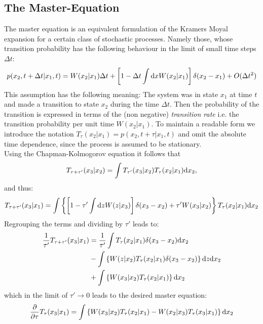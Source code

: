 \subsection{The Master-Equation}
\label{The_Master_Equation}
The master equation is an equivalent formulation of the Kramers Moyal expansion for a certain class of stochastic processes. Namely those, whose transition probability has the following behaviour in the limit of small time steps $\Delta t$:
\begin{equation}
    p(x_2,t+\Delta t|x_1,t) = W(x_2|x_1)\Delta t + \left[ 1 - \Delta t \int {\rm d} x W(x_2|x_1) \right] \delta(x_2-x_1) + O(\Delta t ^{2})
    \label{master assumption}
\end{equation}
This assumption has the following meaning: The system was in state $x_1$ at time $t$ and made a transition to state $x_2$ during the time $\Delta t$. Then the probability of the transition is expressed in terms of the (non negative) {\it transition rate} i.e. the transition probability per unit time $W(x_2|x_1)$. To maintain a readable form we introduce the notation $T_\tau (x_2|x_1) = p(x_2,t+\tau|x_1,t)$ and omit the absolute time dependence, since the process is assumed to be stationary. \\
Using the Chapman-Kolmogorov equation it follows that
\begin{equation}
    T_{\tau + \tau'}(x_3|x_2) = \int T_{\tau'}(x_3|x_2)T_{\tau}(x_2|x_1){\rm d} x_2,
    \label{K2}
\end{equation}
and thus:
\begin{equation*}
    T_{\tau+\tau'}(x_3|x_1) = \int \left\{ \left[1 - \tau' \int {\rm d} z W(z|x_3) \right] \delta(x_3 - x_2) + \tau' W(x_3|x_2) \right\} T_{\tau}(x_2|x_1){\rm d} x_2
\end{equation*}
Regrouping the terms and dividing by $\tau ' $ leads to:
\begin{align*}
    \frac{1}{\tau'} T_{\tau+\tau'}(x_3|x_1) &= \frac{1}{\tau'}  \int T_{\tau}(x_2|x_1) \delta(x_3 - x_2){\rm d} x_2\\
    &- \int \left\{ W(z|x_2)  T_{\tau}(x_2|x_1)\delta(x_3 - x_2) \right\}{\rm d} z {\rm d} x_2 \\
    &+ \int \left\{ W(x_3|x_2) T_{\tau}(x_2|x_1) \right\}{\rm d} x_2
\end{align*}
which in the limit of $\tau' \rightarrow 0$ leads to the desired master equation:
\begin{equation}
    \frac{\partial}{\partial \tau}T_{\tau}(x_3|x_1) = \int \left\{ W(x_3|x_2) T_{\tau}(x_2|x_1) - W(x_2|x_3) T_{\tau}(x_3|x_1) \right\}{\rm d} x_2
    \label{continuous_space_master_equation}
\end{equation}
